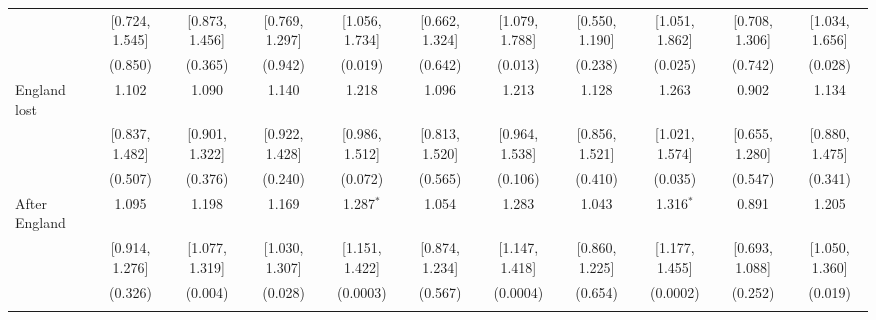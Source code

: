 \documentclass[12pt, a4paper]{article}
\begin{document}
\begin{table}
{\begin{threeparttable}
\begin{tabular}{@{\extracolsep{5pt}}lcccccccccc}
  & [0.724, 1.545] & [0.873, 1.456] & [0.769, 1.297] & [1.056, 1.734] & [0.662, 1.324] & [1.079, 1.788] & [0.550, 1.190] & [1.051, 1.862] & [0.708, 1.306] & [1.034, 1.656] \\ 
  & (0.850) & (0.365) & (0.942) & (0.019) & (0.642) & (0.013) & (0.238) & (0.025) & (0.742) & (0.028) \\ 
  England lost & 1.102 & 1.090 & 1.140 & 1.218 & 1.096 & 1.213 & 1.128 & 1.263 & 0.902 & 1.134 \\ 
  & [0.837, 1.482] & [0.901, 1.322] & [0.922, 1.428] & [0.986, 1.512] & [0.813, 1.520] & [0.964, 1.538] & [0.856, 1.521] & [1.021, 1.574] & [0.655, 1.280] & [0.880, 1.475] \\ 
  & (0.507) & (0.376) & (0.240) & (0.072) & (0.565) & (0.106) & (0.410) & (0.035) & (0.547) & (0.341) \\ 
  After England & 1.095 & 1.198 & 1.169 & 1.287$^{*}$ & 1.054 & 1.283 & 1.043 & 1.316$^{*}$ & 0.891 & 1.205 \\ 
  & [0.914, 1.276] & [1.077, 1.319] & [1.030, 1.307] & [1.151, 1.422] & [0.874, 1.234] & [1.147, 1.418] & [0.860, 1.225] & [1.177, 1.455] & [0.693, 1.088] & [1.050, 1.360] \\ 
  & (0.326) & (0.004) & (0.028) & (0.0003) & (0.567) & (0.0004) & (0.654) & (0.0002) & (0.252) & (0.019) \\ 
 \hline \\[-1.8ex] 


\end{tabular}
\end{threeparttable}}
\end{table}
\end{document}
